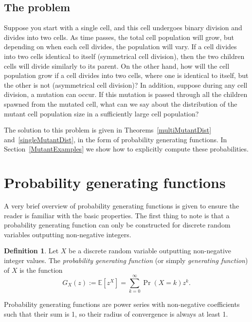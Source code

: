 \documentclass[12pt]{amsart}
\theoremstyle{plain}
\theoremstyle{definition}
\newtheorem{defn}[thm]{Definition}
\theoremstyle{remark}
\theoremstyle{definition}
\begin{document}
\subsection{The problem}

Suppose you start with a single cell, and this cell undergoes binary division and divides into two cells. As time passes, the total cell population will grow, but depending on when each cell divides, the population will vary. If a cell divides into two cells identical to itself (symmetrical cell division), then the two children cells will divide similarly to its parent. On the other hand, how will the cell population grow if a cell divides into two cells, where one is identical to itself, but the other is not (asymmetrical cell division)? In addition, suppose during any cell division, a mutation can occur. If this mutation is passed through all the children spawned from the mutated cell, what can we say about the distribution of the mutant cell population size in a sufficiently large cell population?

The solution to this problem is given in Theorems~\ref{multiMutantDist} and~\ref{singleMutantDist}, in the form of probability generating functions.  In Section~\ref{MutantExamples} we show how to explicitly compute these probabilities.


\section{Probability generating functions} \label{pgf}

A very brief overview of probability generating functions is given to ensure the reader is familiar with the basic properties. The first thing to note is that a probability generating function can only be constructed for discrete random variables outputting non-negative integers.

\begin{defn}
Let $X$ be a discrete random variable outputting non-negative integer values. The \emph{probability generating function} (or simply \emph{generating function}) of $X$ is the function
\begin{equation}
G_X(z) := \mathbb{E}\left[z^X\right] = \sum_{k=0}^\infty \Pr(X=k) z^k.
\end{equation}
\end{defn}

Probability generating functions are power series with non-negative coefficients such that their sum is 1, so their radius of convergence is always at least 1.
\end{document}
